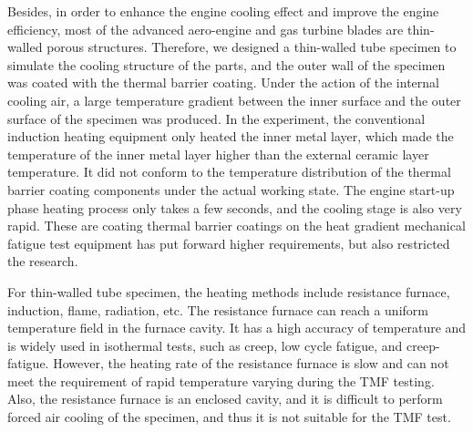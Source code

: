 \documentclass[preprint,5p,twocolumn,11pt,sort&compress]{elsarticle}
\begin{document}
Besides, in order to enhance the engine cooling effect and improve the engine efficiency, most of the advanced aero-engine and gas turbine blades are thin-walled porous structures.
Therefore, we designed a thin-walled tube specimen to simulate the cooling structure of the parts, and the outer wall of the specimen was coated with the thermal barrier coating.
Under the action of the internal cooling air, a large temperature gradient between the inner surface and the outer surface of the specimen was produced.
In the experiment, the conventional induction heating equipment only heated the inner metal layer, which made the temperature of the inner metal layer higher than the external ceramic layer temperature. It did not conform to the temperature distribution of the thermal barrier coating components under the actual working state.
The engine start-up phase heating process only takes a few seconds, and the cooling stage is also very rapid. These are coating thermal barrier coatings on the heat gradient mechanical fatigue test equipment has put forward higher requirements, but also restricted the research.

For thin-walled tube specimen, the heating methods include resistance furnace, induction, flame, radiation, etc.
The resistance furnace can reach a uniform temperature field in the furnace cavity. It has a high accuracy of temperature and is widely used in isothermal tests, such as creep, low cycle fatigue, and creep-fatigue. However, the heating rate of the resistance furnace is slow and can not meet the requirement of rapid temperature varying during the TMF testing. Also, the resistance furnace is an enclosed cavity, and it is difficult to perform forced air cooling of the specimen, and thus it is not suitable for the TMF test.
\end{document}
